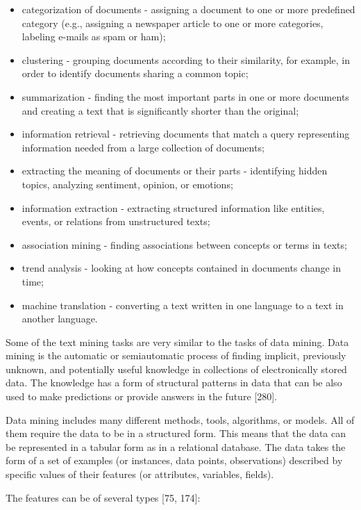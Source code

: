 \documentclass[10pt]{book}
\begin{document}
\begin{itemize}
  \item categorization of documents - assigning a document to one or more predefined category (e.g., assigning a newspaper article to one or more categories, labeling e-mails as spam or ham);
  \item clustering - grouping documents according to their similarity, for example, in order to identify documents sharing a common topic;
  \item summarization - finding the most important parts in one or more documents and creating a text that is significantly shorter than the original;
  \item information retrieval - retrieving documents that match a query representing information needed from a large collection of documents;
  \item extracting the meaning of documents or their parts - identifying hidden topics, analyzing sentiment, opinion, or emotions;
  \item information extraction - extracting structured information like entities, events, or relations from unstructured texts;
  \item association mining - finding associations between concepts or terms in texts;
  \item trend analysis - looking at how concepts contained in documents change in time;
  \item machine translation - converting a text written in one language to a text in another language.
\end{itemize}

Some of the text mining tasks are very similar to the tasks of data mining. Data mining is the automatic or semiautomatic process of finding implicit, previously unknown, and potentially useful knowledge in collections of electronically stored data. The knowledge has a form of structural patterns in data that can be also used to make predictions or provide answers in the future [280].

Data mining includes many different methods, tools, algorithms, or models. All of them require the data to be in a structured form. This means that the data can be represented in a tabular form as in a relational database. The data takes the form of a set of examples (or instances, data points, observations) described by specific values of their features (or attributes, variables, fields).

The features can be of several types [75, 174]:
\end{document}
